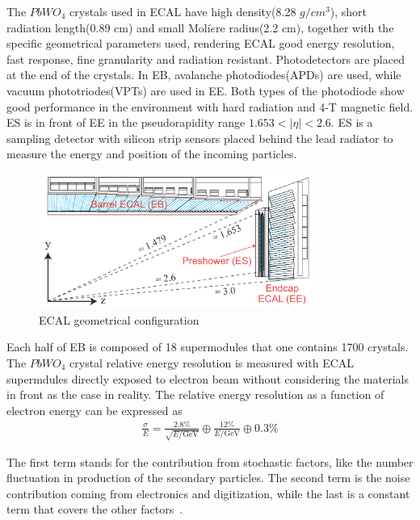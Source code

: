 The $PbWO_{4}$ crystals used in ECAL have high density(8.28 $g/cm^{3}$), short radiation length(0.89 cm) and small Moli$\grave{e}$re radius(2.2 cm), together with the specific geometrical parameters used, rendering ECAL  good energy resolution, fast response, fine granularity and radiation resistant. Photodetectors are placed at the end of the crystals. In EB, avalanche photodiodes(APDs) are used, while vacuum phototriodes(VPTs) are used in EE. Both types of the photodiode show good performance in the environment with hard radiation and 4-T magnetic field. ES is in front of EE in the pseudorapidity range $1.653<|\eta|<2.6$. ES is a sampling detector with silicon strip sensors placed behind the lead radiator to measure the energy and position of the incoming particles.  

\begin{figure}[htbp] 
\centering
\includegraphics[width=0.8\textwidth]{chapter3/ECAL_transverse.png}
\caption{ECAL geometrical configuration~\cite{CMS_TDR}}
\label{fig:ECAL_sketch}
\end{figure}

Each half of EB is composed of 18 supermodules that one contains 1700 crystals. The $PbWO_{4}$ crystal relative energy resolution is measured with ECAL supermdules directly exposed to electron beam without considering the materials in front as the case in reality. The relative energy resolution as a function of electron energy can be expressed as 
\begin{align*}
\frac{\sigma}{E}=\frac{2.8\%}{\sqrt{E/\textrm{GeV}}}\oplus\frac{12\%}{E/\textrm{GeV}}\oplus 0.3\%
\end{align*}

The first term stands for the contribution from stochastic factors, like the number fluctuation in production of the secondary particles. The second term is the noise contribution coming from electronics and digitization, while the last is a constant term that covers the other factors~\cite{ECAL_EB_reso}.

